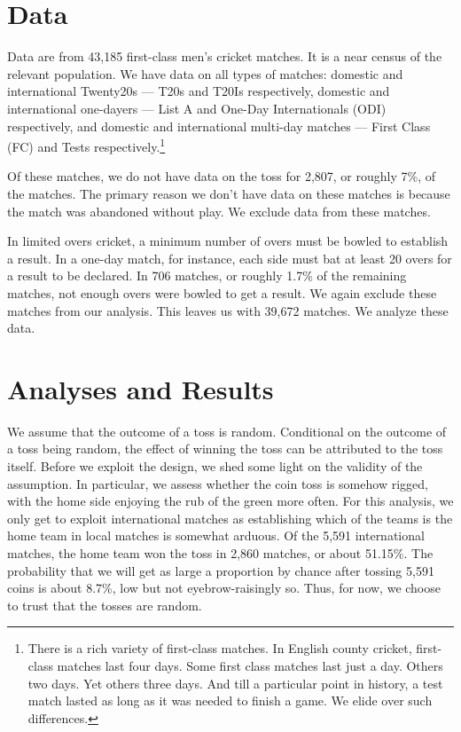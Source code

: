 \documentclass[12pt]{article}
\begin{document}
\section*{Data}
Data are from 43,185 first-class men's cricket matches. It is a near census of the relevant population. We have data on all types of matches: domestic and international Twenty20s --- T20s and T20Is respectively, domestic and international one-dayers --- List A and One-Day Internationals (ODI) respectively, and domestic and international multi-day matches --- First Class (FC) and Tests respectively.\footnote{There is a rich variety of first-class matches. In English county cricket, first-class matches last four days. Some first class matches last just a day. Others two days. Yet others three days. And till a particular point in history, a test match lasted as long as it was needed to finish a game. We elide over such differences.} 

Of these matches, we do not have data on the toss for 2,807, or roughly 7\%, of the matches. The primary reason we don't have data on these matches is because the match was abandoned without play. We exclude data from these matches. 

In limited overs cricket, a minimum number of overs must be bowled to establish a result. In a one-day match, for instance, each side must bat at least 20 overs for a result to be declared. In 706 matches, or roughly 1.7\% of the remaining matches, not enough overs were bowled to get a result. We again exclude these matches from our analysis. This leaves us with 39,672 matches. We analyze these data.
 
\section*{Analyses and Results}

We assume that the outcome of a toss is random. Conditional on the outcome of a toss being random, the effect of winning the toss can be attributed to the toss itself. Before we exploit the design, we shed some light on the validity of the assumption. In particular, we assess whether the coin toss is somehow rigged, with the home side enjoying the rub of the green more often. For this analysis, we only get to exploit international matches as establishing which of the teams is the home team in local matches is somewhat arduous. Of the 5,591 international matches, the home team won the toss in 2,860 matches, or about 51.15\%. The probability that we will get as large a proportion by chance after tossing 5,591 coins is about 8.7\%, low but not eyebrow-raisingly so. Thus, for now, we choose to trust that the tosses are random.
\end{document}
